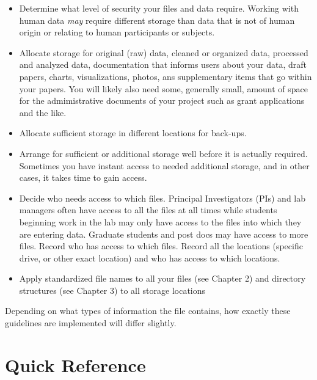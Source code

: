 \documentclass[
]{book}
\providecommand{\tightlist}{%
  \setlength{\itemsep}{0pt}\setlength{\parskip}{0pt}}
\begin{document}
\begin{itemize}
\tightlist
\item
  Determine what level of security your files and data require. Working with human data \emph{may} require different storage than data that is not of human origin or relating to human participants or subjects.
\item
  Allocate storage for original (raw) data, cleaned or organized data, processed and analyzed data, documentation that informs users about your data, draft papers, charts, visualizations, photos, ans supplementary items that go within your papers. You will likely also need some, generally small, amount of space for the admimistrative documents of your project such as grant applications and the like.
\item
  Allocate sufficient storage in different locations for back-ups.
\item
  Arrange for sufficient or additional storage well before it is actually required. Sometimes you have instant access to needed additional storage, and in other cases, it takes time to gain access.
\item
  Decide who needs access to which files. Principal Investigators (PIs) and lab managers often have access to all the files at all times while students beginning work in the lab may only have access to the files into which they are entering data. Graduate students and post docs may have access to more files. Record who has access to which files. Record all the locations (specific drive, or other exact location) and who has access to which locations.
\item
  Apply standardized file names to all your files (see Chapter 2) and directory structures (see Chapter 3) to all storage locations
\end{itemize}

Depending on what types of information the file contains, how exactly these guidelines are implemented will differ slightly.

\hypertarget{quick-reference-2}{%
\section*{Quick Reference}\label{quick-reference-2}}
\end{document}
